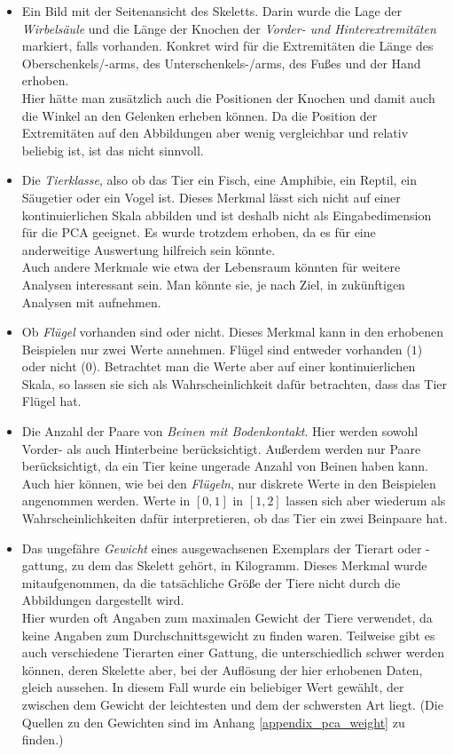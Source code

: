  \begin{itemize}
  \item Ein Bild mit der Seitenansicht des Skeletts.
  Darin wurde die Lage der \emph{Wirbelsäule} und die Länge der Knochen der \emph{Vorder- und Hinterextremitäten} markiert, falls vorhanden. Konkret wird für die Extremitäten die Länge des Oberschenkels/-arms, des Unterschenkels-/arms, des Fußes und der Hand erhoben.\\
  Hier hätte man zusätzlich auch die Positionen der Knochen und damit auch die Winkel an den Gelenken erheben können. Da die Position der Extremitäten auf den Abbildungen aber wenig vergleichbar und relativ beliebig ist, ist das nicht sinnvoll.
  
  \item Die \emph{Tierklasse}, also ob das Tier ein Fisch, eine Amphibie, ein Reptil, ein Säugetier oder ein Vogel ist. Dieses Merkmal lässt sich nicht auf einer kontinuierlichen Skala abbilden und ist deshalb nicht als Eingabedimension für die PCA geeignet. Es wurde trotzdem erhoben, da es für eine anderweitige Auswertung hilfreich sein könnte.\\
  Auch andere Merkmale wie etwa der Lebensraum könnten für weitere Analysen interessant sein. Man könnte sie, je nach Ziel, in zukünftigen Analysen mit aufnehmen.
  
  \item Ob \emph{Flügel} vorhanden sind oder nicht. Dieses Merkmal kann in den erhobenen Beispielen nur zwei Werte annehmen. Flügel sind entweder vorhanden ($1$) oder nicht ($0$). Betrachtet man die Werte aber auf einer kontinuierlichen Skala, so lassen sie sich als Wahrscheinlichkeit dafür betrachten, dass das Tier Flügel hat.
  
  \item Die Anzahl der Paare von \emph{Beinen mit Bodenkontakt}. Hier werden sowohl Vorder- als auch Hinterbeine berücksichtigt. Außerdem werden nur Paare berücksichtigt, da ein Tier keine ungerade Anzahl von Beinen haben kann.\\
  Auch hier können, wie bei den \emph{Flügeln}, nur diskrete Werte in den Beispielen angenommen werden. Werte in $[0, 1]$ \bzw in $[1, 2]$ lassen sich aber wiederum als Wahrscheinlichkeiten dafür interpretieren, ob das Tier ein \bzw zwei Beinpaare hat.
  
  \item Das ungefähre \emph{Gewicht} eines ausgewachsenen Exemplars der Tierart oder -gattung, zu dem das Skelett gehört, in Kilogramm. Dieses Merkmal wurde mitaufgenommen, da die tatsächliche Größe der Tiere nicht durch die Abbildungen dargestellt wird.\\
  Hier wurden oft Angaben zum maximalen Gewicht der Tiere verwendet, da keine Angaben zum Durchschnittsgewicht zu finden waren. Teilweise gibt es auch verschiedene Tierarten einer Gattung, die unterschiedlich schwer werden können, deren Skelette aber, bei der Auflösung der hier erhobenen Daten, gleich aussehen. In diesem Fall wurde ein beliebiger Wert gewählt, der zwischen dem Gewicht der leichtesten und dem der schwersten Art liegt. (Die Quellen zu den Gewichten sind im Anhang \ref{appendix_pca_weight} zu finden.)
 \end{itemize}

